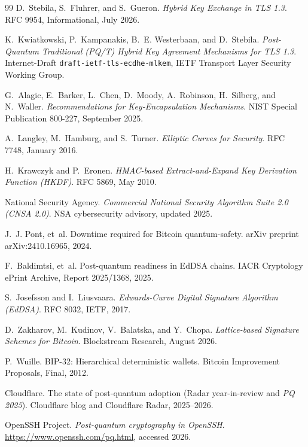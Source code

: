 \begin{thebibliography}{99}
 D.~Stebila, S.~Fluhrer, and S.~Gueron.
\newblock \emph{Hybrid Key Exchange in TLS 1.3}.
\newblock RFC 9954, Informational, July 2026.

 K.~Kwiatkowski, P.~Kampanakis, B.~E. Westerbaan, and D.~Stebila.
\newblock \emph{Post-Quantum Traditional (PQ/T) Hybrid Key Agreement Mechanisms for TLS 1.3}.
\newblock Internet-Draft \texttt{draft-ietf-tls-ecdhe-mlkem}, IETF Transport Layer Security Working Group.

 G.~Alagic, E.~Barker, L.~Chen, D.~Moody, A.~Robinson, H.~Silberg, and N.~Waller.
\newblock \emph{Recommendations for Key-Encapsulation Mechanisms}.
\newblock NIST Special Publication 800-227, September 2025.

 A.~Langley, M.~Hamburg, and S.~Turner.
\newblock \emph{Elliptic Curves for Security}.
\newblock RFC 7748, January 2016.

 H.~Krawczyk and P.~Eronen.
\newblock \emph{HMAC-based Extract-and-Expand Key Derivation Function (HKDF)}.
\newblock RFC 5869, May 2010.

 National Security Agency.
\newblock \emph{Commercial National Security Algorithm Suite 2.0 (CNSA 2.0)}.
\newblock NSA cybersecurity advisory, updated 2025.

 J.~J. Pont, et~al.
\newblock Downtime required for Bitcoin quantum-safety.
\newblock arXiv preprint arXiv:2410.16965, 2024.

 F.~Baldimtsi, et~al.
\newblock Post-quantum readiness in EdDSA chains.
\newblock IACR Cryptology ePrint Archive, Report 2025/1368, 2025.

 S.~Josefsson and I.~Liusvaara.
\newblock \emph{Edwards-Curve Digital Signature Algorithm (EdDSA)}.
\newblock RFC 8032, IETF, 2017.

 D.~Zakharov, M.~Kudinov, V.~Balatska, and Y.~Chopa.
\newblock \emph{Lattice-based Signature Schemes for Bitcoin}.
\newblock Blockstream Research, August 2026.

 P.~Wuille.
\newblock BIP-32: Hierarchical deterministic wallets.
\newblock Bitcoin Improvement Proposals, Final, 2012.

 Cloudflare.
\newblock The state of post-quantum adoption (Radar year-in-review and
\emph{PQ 2025}).
\newblock Cloudflare blog and Cloudflare Radar, 2025--2026.

 OpenSSH Project.
\newblock \emph{Post-quantum cryptography in OpenSSH}.
\newblock \url{https://www.openssh.com/pq.html}, accessed 2026.


\end{thebibliography}
